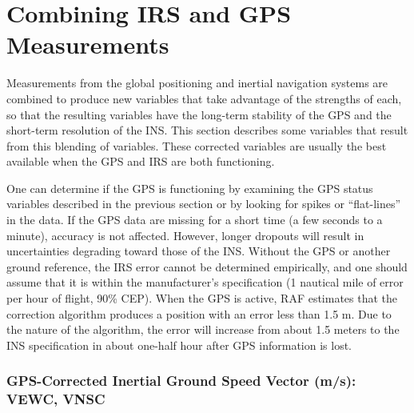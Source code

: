 \documentclass[
  english,
]{book}
\begin{document}
\hypertarget{combining-irs-and-gps-measurements}{%
\section{Combining IRS and GPS
Measurements}\label{combining-irs-and-gps-measurements}}

Measurements from the global positioning and inertial navigation systems
are combined to produce new variables that take advantage of the
strengths of each, so that the resulting variables have the long-term
stability of the GPS and the short-term resolution of the INS. This
section describes some variables that result from this blending of
variables. These corrected variables are usually the best available when
the GPS and IRS are both functioning.

One can determine if the GPS is functioning by examining the GPS status
variables described in the previous section or by looking for spikes or
``flat-lines'' in the data. If the GPS data are missing for a short time
(a few seconds to a minute), accuracy is not affected. However, longer
dropouts will result in uncertainties degrading toward those of the INS.
Without the GPS or another ground reference, the IRS error cannot be
determined empirically, and one should assume that it is within the
manufacturer's specification (1 nautical mile of error per hour of
flight, 90\% CEP). When the GPS is active, RAF estimates that the
correction algorithm produces a position with an error less than 1.5 m.
Due to the nature of the algorithm, the error will increase from about
1.5 meters to the INS specification in about one-half hour after GPS
information is lost.

\hypertarget{vewc-vnsc}{%
\subsubsection*{GPS-Corrected Inertial Ground Speed Vector (m/s): VEWC,
VNSC}\label{vewc-vnsc}}
\end{document}
